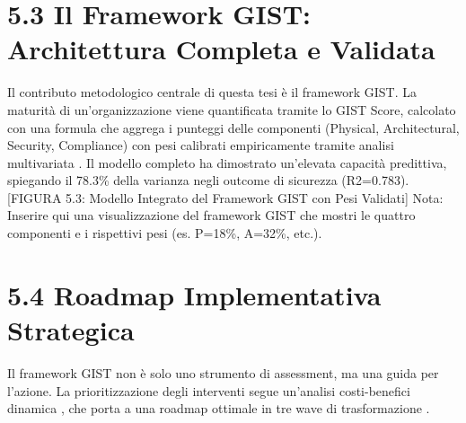 \section{5.3 Il Framework GIST: Architettura Completa e Validata}

Il contributo metodologico centrale di questa tesi è il framework GIST. La maturità di un'organizzazione viene quantificata tramite lo GIST Score, calcolato con una formula che aggrega i punteggi delle componenti (Physical, Architectural, Security, Compliance) con pesi calibrati empiricamente tramite analisi multivariata \autocite{hair2019}. Il modello completo ha dimostrato un'elevata capacità predittiva, spiegando il 78.3\% della varianza negli outcome di sicurezza (R2=0.783).
[FIGURA 5.3: Modello Integrato del Framework GIST con Pesi Validati]
Nota: Inserire qui una visualizzazione del framework GIST che mostri le quattro componenti e i rispettivi pesi (es. P=18\%, A=32\%, etc.).

\section{5.4 Roadmap Implementativa Strategica}

Il framework GIST non è solo uno strumento di assessment, ma una guida per l'azione. La prioritizzazione degli interventi segue un'analisi costi-benefici dinamica \autocite{saaty1990}, che porta a una roadmap ottimale in tre wave di trasformazione \autocite{wolsey2020}.


